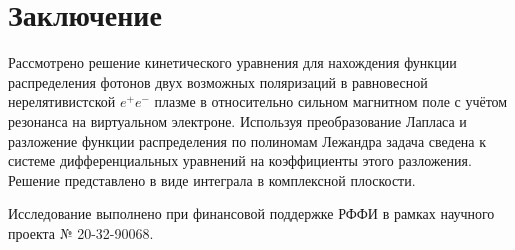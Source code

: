 \documentclass[a4paper]{panl}
\begin{document}
\section*{Заключение}
Рассмотрено решение кинетического уравнения для нахождения функции распределения фотонов двух возможных поляризаций в равновесной нерелятивистской $e^+e^-$ плазме в относительно сильном магнитном поле с учётом резонанса на виртуальном электроне.
Используя преобразование Лапласа и разложение функции распределения по полиномам Лежандра задача сведена к системе дифференциальных уравнений на коэффициенты этого разложения. Решение представлено в виде интеграла в комплексной плоскости.

Исследование выполнено при финансовой поддержке РФФИ в рамках научного проекта № 20-32-90068.

%
%
\end{document}
